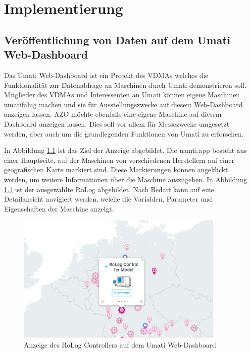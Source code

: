 \documentclass[a4paper, 12pt, oneside, toc=listofnumbered, bibliography=totoc]{scrbook}
\begin{document}
\chapter{Implementierung}\label{ch:Implementierung}
	
	\section{Veröffentlichung von Daten auf dem Umati Web-Dashboard}\label{ch:Implementierung-Web}
		
		Das Umati Web-Dashboard ist ein Projekt des VDMAs welches die Funktionalität zur Datenabfrage an Maschinen durch Umati demonstrieren soll. Mitglieder des VDMAs und Interessenten an Umati können eigene Maschinen umatifähig machen und sie für Ausstellungszwecke auf diesem Web-Dashboard anzeigen lassen. AZO möchte ebenfalls eine eigene Maschine auf diesem Dashboard anzeigen lassen. Dies soll vor allem für Messezwecke umgesetzt werden, aber auch um die grundlegenden Funktionen von Umati zu erforschen.
		
		In Abbildung \ref{fig:umatiApp} ist das Ziel der Anzeige abgebildet. Die uamti.app besteht aus einer Hauptseite, auf der Maschinen von verschiedenen Herstellern auf einer geografischen Karte markiert sind. Diese Markierungen können angeklickt werden, um weitere Informationen über die Maschine auszugeben. In Abbildung \ref{fig:umatiApp} ist der ausgewählte RoLog abgebildet. Nach Bedarf kann auf eine Detailansicht navigiert werden, welche die Variablen, Parameter und Eigenschaften der Maschine anzeigt.
		
		\begin{figure}[H]
			\centering
			\includegraphics[width=0.9\textwidth]{res/UmatiApp.png}
			\caption{Anzeige des RoLog Controllers auf dem Umati Web-Dashboard}
			\label{fig:umatiApp}
		\end{figure}
		
\end{document}

